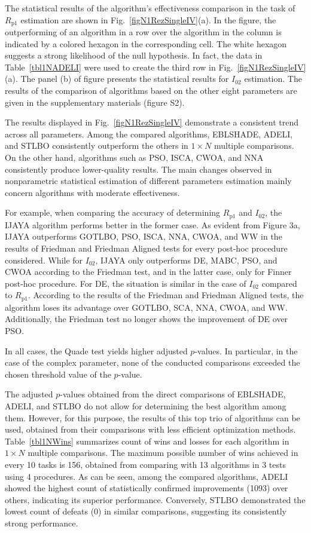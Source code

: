 \documentclass[a4paper,fleqn]{cas-dc}
\begin{document}
The statistical results of the algorithm's effectiveness comparison in the task  of $R_\mathrm{p1}$ estimation are shown in Fig.~\ref{figN1RezSingleIV}(a).
In the figure, the outperforming of an algorithm in a row over the algorithm in the column is indicated by a colored hexagon in the corresponding cell.
The white hexagon suggests a strong likelihood of the null hypothesis.
In fact, the data in Table~\ref{tbl1NADELI} were used to create the third row in Fig.~\ref{figN1RezSingleIV}(a).
The panel (b) of figure presents the statistical results for $I_{02}$ estimation.
The results of the comparison of algorithms based on the other eight parameters are given in the supplementary materials (figure S2).


The results displayed in Fig.~\ref{figN1RezSingleIV} demonstrate a consistent trend across all parameters.
Among the compared algorithms, EBLSHADE, ADELI, and STLBO consistently outperform the others in $1\times N$ multiple comparisons.
On the other hand, algorithms such as PSO, ISCA, CWOA, and NNA consistently produce lower-quality results.
The main changes observed in nonparametric statistical estimation of different parameters estimation
mainly concern algorithms with moderate effectiveness.

For example, when comparing the accuracy of determining $R_\mathrm{p1}$ and $I_{02}$,
the IJAYA algorithm performs better in the former case.
As evident from Figure 3a,
IJAYA outperforms GOTLBO, PSO, ISCA, NNA, CWOA, and WW in the results of Friedman
and Friedman Aligned tests for every post-hoc procedure considered.
While for $I_{02}$, IJAYA only outperforms DE, MABC, PSO, and CWOA according to the Friedman test,
and in the latter case, only for Finner post-hoc procedure.
For DE, the situation is similar in the case of $I_{02}$ compared to $R_\mathrm{p1}$.
According to the results of the Friedman and Friedman Aligned tests, the algorithm loses its advantage over GOTLBO, SCA, NNA, CWOA, and WW.
Additionally, the Friedman test no longer shows the improvement of DE over PSO.




In all cases, the Quade test yields higher adjusted $p$-values.
In particular, in the case of the complex parameter, none of the conducted comparisons exceeded the chosen threshold value of the $p$-value.

The adjusted $p$-values obtained from the direct comparisons of EBLSHADE, ADELI, and STLBO
do not allow for determining the best algorithm among them.
However, for this purpose, the results of this top trio of algorithms can be used,
obtained from their comparisons with less efficient optimization methods.
Table~\ref{tbl1NWins} summarizes count of wins and losses for each algorithm in $1\times N$ multiple comparisons.
The maximum possible number of wins achieved in every 10 tasks is 156,
obtained from comparing with 13 algorithms in 3 tests using 4 procedures.
As can be seen, among the compared algorithms,
ADELI showed the highest count of statistically confirmed improvements (1093) over others,
indicating its superior performance.
Conversely, STLBO demonstrated the lowest count of defeats (0) in similar comparisons, suggesting its consistently strong performance.
\end{document}
